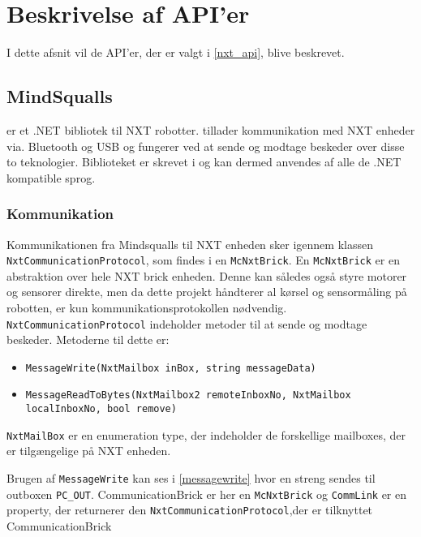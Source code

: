
\section{Beskrivelse af API'er}

I dette afsnit vil de API'er, der er valgt i \cref{nxt_api}, blive beskrevet.

\subsection{MindSqualls}\label{mindsqualls}
\mindsqualls er et .NET bibliotek til \legos NXT robotter.
\mindsqualls tillader kommunikation med NXT enheder via. Bluetooth og USB og fungerer ved at sende og modtage beskeder over disse to teknologier.
Biblioteket er skrevet i \csharp og kan dermed anvendes af alle de .NET kompatible sprog.

\subsubsection{Kommunikation}
Kommunikationen fra Mindsqualls til NXT enheden sker igennem klassen \lstinline[style=csharp]!NxtCommunicationProtocol!, som findes i en \lstinline[style=csharp]!McNxtBrick!. 
En \lstinline[style=csharp]!McNxtBrick! er en abstraktion over hele NXT brick enheden. 
Denne kan således også styre motorer og sensorer direkte, men da dette projekt håndterer al kørsel og sensormåling på robotten, er kun kommunikationsprotokollen nødvendig.
\lstinline[style=csharp]!NxtCommunicationProtocol! indeholder metoder til at sende og modtage beskeder.
Metoderne til dette er:

\begin{itemize}
\item \lstinline[style=csharp]!MessageWrite(NxtMailbox inBox, string messageData)!
\item \lstinline[style=csharp]!MessageReadToBytes(NxtMailbox2 remoteInboxNo, NxtMailbox localInboxNo, bool remove)!
\end{itemize}

\lstinline[style=csharp]!NxtMailBox! er en enumeration type, der indeholder de forskellige mailboxes, der er tilgængelige på NXT enheden.

Brugen af \lstinline[style=csharp]!MessageWrite! kan ses i \cref{messagewrite} hvor en streng sendes til outboxen \lstinline[style=csharp]!PC_OUT!.
CommunicationBrick er her en \lstinline[style=csharp]!McNxtBrick! og \lstinline[style=csharp]!CommLink! er en property, der returnerer den \lstinline[style=csharp]!NxtCommunicationProtocol!,der er tilknyttet CommunicationBrick 

